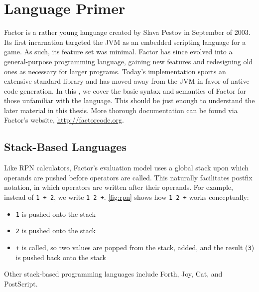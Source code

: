 \section{Language Primer}\label{sec:primer}


Factor is a rather young language created by Slava Pestov in September of 2003.
Its first incarnation targeted the \gls{JVM} as an embedded scripting language
for a game.  As such, its feature set was minimal.  Factor has since evolved
into a general-purpose programming language, gaining new features and
redesigning old ones as necessary for larger programs.  Today's implementation
sports an extensive standard library and has moved away from the \gls{JVM} in
favor of native code generation.  In this , we cover the
basic syntax and semantics of Factor for those unfamiliar with the language.
This should be just enough to understand the later material in this thesis.
More thorough documentation can be found via Factor's website,
\url{http://factorcode.org}.

\subsection{Stack-Based Languages}\label{sec:primer:stack-based}


Like \gls{RPN} calculators, Factor's evaluation model uses a global stack upon
which operands are pushed before operators are called.  This naturally
facilitates postfix notation, in which operators are written after their
operands.  For example, instead of \texttt{1~+~2}, we write \texttt{1~2~+}.
\vref{fig:rpn} shows how \texttt{1~2~+} works conceptually:
\begin{itemize}
  \item \texttt{1} is pushed onto the stack
  \item \texttt{2} is pushed onto the stack
  \item \texttt{+} is called, so two values are popped from the stack, added,
        and the result (\texttt{3}) is pushed back onto the stack
\end{itemize}
Other stack-based programming languages include Forth,
Joy, Cat, and PostScript.

